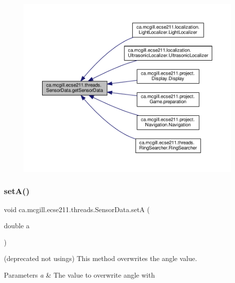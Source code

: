 \begin{figure}[H]
\begin{center}
\leavevmode
\includegraphics[width=350pt]{classca_1_1mcgill_1_1ecse211_1_1threads_1_1_sensor_data_a8260aba53b4474ca1275e4ce26157977_icgraph}
\end{center}
\end{figure}
\mbox{\label{classca_1_1mcgill_1_1ecse211_1_1threads_1_1_sensor_data_a35b1941d44e86b81eb7c625efbd3c8ba}} 
\subsubsection{\texorpdfstring{set\+A()}{setA()}}
{\footnotesize\ttfamily void ca.\+mcgill.\+ecse211.\+threads.\+Sensor\+Data.\+setA (\begin{DoxyParamCaption}\item[{double}]{a }\end{DoxyParamCaption})}

(deprecated not usings) This method overwrites the angle value.


\begin{DoxyParams}{Parameters}
{\em a} & The value to overwrite angle with \\
\hline
\end{DoxyParams}


